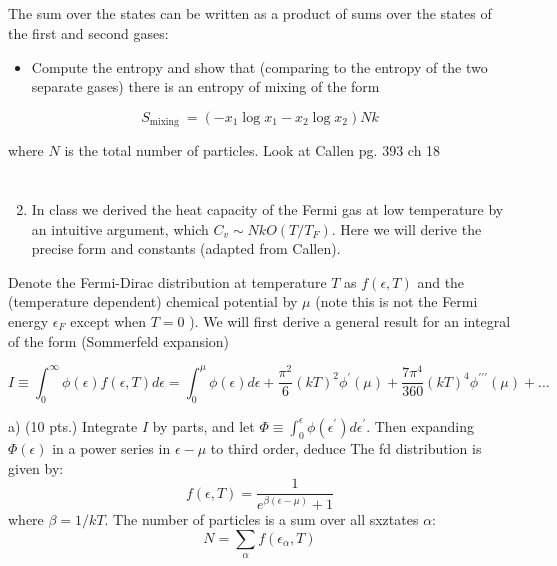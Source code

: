 \documentclass[12pt]{article}
\begin{document}
\subsection{}
The sum over the states can be written as a product of sums over the states of the first and second gases:
\begin{itemize}
  \item Compute the entropy and show that (comparing to the entropy of the two separate gases) there is an entropy of mixing of the form
\end{itemize}

$$
S_{\text {mixing }}=\left(-x_{1} \log x_{1}-x_{2} \log x_{2}\right) N k
$$

where $N$ is the total number of particles.
Look at Callen pg. 393 ch 18
\section{}
\begin{enumerate}
  \setcounter{enumi}{1}
  \item In class we derived the heat capacity of the Fermi gas at low temperature by an intuitive argument, which $C_{v} \sim N k O\left(T / T_{F}\right)$. Here we will derive the precise form and constants (adapted from Callen).
\end{enumerate}

Denote the Fermi-Dirac distribution at temperature $T$ as $f(\epsilon, T)$ and the (temperature dependent) chemical potential by $\mu$ (note this is not the Fermi energy $\epsilon_{F}$ except when $T=0$ ). We will first derive a general result for an integral of the form (Sommerfeld expansion)

$$
I \equiv \int_{0}^{\infty} \phi(\epsilon) f(\epsilon, T) d \epsilon=\int_{0}^{\mu} \phi(\epsilon) d \epsilon+\frac{\pi^{2}}{6}(k T)^{2} \phi^{\prime}(\mu)+\frac{7 \pi^{4}}{360}(k T)^{4} \phi^{\prime \prime \prime}(\mu)+\ldots
$$

a) (10 pts.) Integrate $I$ by parts, and let $\Phi \equiv \int_{0}^{\epsilon} \phi\left(\epsilon^{\prime}\right) d \epsilon^{\prime}$. Then expanding $\Phi(\epsilon)$ in a power series in $\epsilon-\mu$ to third order, deduce
The fd distribution is given by:
\begin{equation}
  f(\epsilon, T) = \frac{1}{e^{\beta(\epsilon - \mu)} + 1}
\end{equation}
where $\beta = 1/kT$. The number of particles is a sum over all sxztates $\alpha$:
\begin{equation}
  N = \sum_{\alpha} f(\epsilon_{\alpha}, T)
\end{equation}
\end{document}
